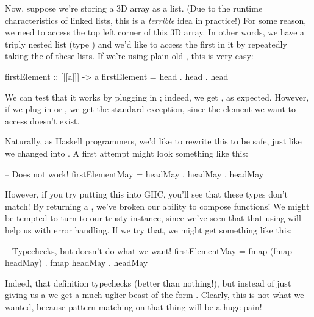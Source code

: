 Now, suppose we're storing a 3D array as a list. (Due to the runtime characteristics of linked
lists, this is a \emph{terrible} idea in practice!) For some reason, we need to access the top left
corner of this 3D array. In other words, we have a triply nested list (type \inline{[[[a]]]}) and
we'd like to access the first  in it by repeatedly taking the  of these
lists. If we're using plain old , this is very easy:
\begin{haskell}
firstElement :: [[[a]]] -> a
firstElement = head . head . head
\end{haskell}
We can test that it works by plugging in ; indeed, we get ,
as expected. However, if we plug in \inline{[[]]} or \inline{[[[]]]}, we get the standard
 exception, since the element we want to access doesn't exist.

Naturally, as Haskell programmers, we'd like to rewrite this to be safe, just like we changed
 into . A first attempt might look something like this:
\begin{haskell}
-- Does not work!
firstElementMay = headMay . headMay . headMay
\end{haskell}
However, if you try putting this into GHC, you'll see that these types don't match! By returning a
, we've broken our ability to compose functions! We might be tempted to turn to our
trusty  instance, since we've seen that that using  will help us with
error handling. If we try that, we might get something like this:
\begin{haskell}
-- Typechecks, but doesn't do what we want!
firstElementMay = fmap (fmap headMay) . fmap headMay . headMay
\end{haskell}
Indeed, that definition typechecks (better than nothing!), but instead of just giving us a
 we get a much uglier beast of the form . Clearly,
this is not what we wanted, because pattern matching on that thing will be a huge pain!

